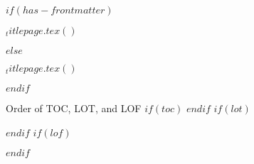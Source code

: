 $if(has-frontmatter)$
  \begin{frontmatter}
  \begin{titlepage}
  $_titlepage.tex()$
  \end{titlepage}
  \end{frontmatter}
$else$
  \begin{titlepage}
  $_titlepage.tex()$
  \end{titlepage}
$endif$

%



%

Order of TOC, LOT, and LOF
$if(toc)$
\tableofcontents
$endif$
$if(lot)$
\listoftables
$endif$
$if(lof)$
\listoffigures
$endif$

